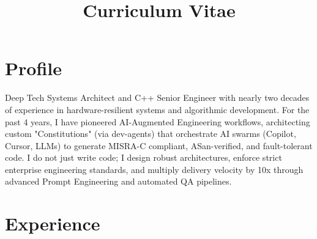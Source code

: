 \documentclass[11pt, a4paper]{moderncv}
\title{Curriculum Vitae}
\begin{document}
\maketitle

\section{Profile}
Deep Tech Systems Architect and C++ Senior Engineer with nearly two decades of experience in hardware-resilient systems and algorithmic development. For the past 4 years, I have pioneered AI-Augmented Engineering workflows, architecting custom "Constitutions" (via dev-agents) that orchestrate AI swarms (Copilot, Cursor, LLMs) to generate MISRA-C compliant, ASan-verified, and fault-tolerant code. I do not just write code; I design robust architectures, enforce strict enterprise engineering standards, and multiply delivery velocity by 10x through advanced Prompt Engineering and automated QA pipelines.

\section{Experience}
\end{document}

